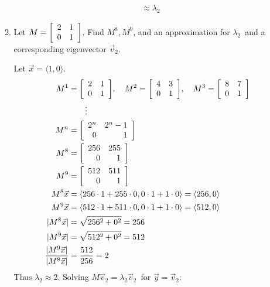 \documentclass{letter}
\newcommand{\norm}[1]{\lvert #1 \rvert}
\newcommand{\Ve}[1]{\langle #1 \rangle}
\newcommand{\Vn}[1]{\vec{#1}}
\newcommand{\?}{\stackrel{?}{=}}
\newcommand\Que[1]{%
   \leavevmode\noindent
   #1
}
\newcommand\Ans[2][]{%
   \leavevmode\noindent
   {
       \begin{mdframed}[backgroundcolor=blue!10]
       #2
       \end{mdframed}
   }
}
\newenvironment{Mat}[1]{%
  \left[\begin{array}{*{#1}{r}}
}{%
  \end{array}\right]
}
\begin{document}
\begin{enumerate}
\begin{enumerate}[label=(\alph*)]
{\begin{align*}
                                        &\approx \lambda_2
       \end{align*}        
    }
    \newpage
    \item \Que{
        Let $M=\begin{Mat}{2} 2 & 1 \\ 0 & 1 \end{Mat}$.  Find $M^8, M^9$, and an approximation for $\lambda_2$\ and a corresponding eigenvector $\Vn{v}_2$.
    }
    \Ans{
        Let $\Vn{x}=\Ve{1,0}$.
        \begin{align*}
          M^1 &= \begin{Mat}{2}  2 &     1 \\ 0 & 1 \end{Mat}, ~~~
          M^2 = \begin{Mat}{2}   4 &     3 \\ 0 & 1 \end{Mat}, ~~~
          M^3 = \begin{Mat}{2}   8 &     7 \\ 0 & 1 \end{Mat}\\
          & ~~~~~~\vdots \\
          M^n &= \begin{Mat}{2} 2^n & 2^n-1 \\ 0 & 1 \end{Mat} \\
          M^8 &= \begin{Mat}{2} 256 & 255 \\ 0 & 1 \end{Mat} \\
          M^9 &= \begin{Mat}{2} 512 & 511 \\ 0 & 1 \end{Mat} \\
          M^8\Vn{x} &= \Ve{256\cdot 1 + 255\cdot 0, 0\cdot 1 + 1\cdot 0}
                    = \Ve{256,0} \\
          M^9\Vn{x} &= \Ve{512\cdot 1+ 511\cdot 0, 0\cdot 1 + 1\cdot 0}
                    = \Ve{512,0}\\
          \norm{M^8\Vn{x}} &= \sqrt{256^2+0^2} = 256\\
          \norm{M^9\Vn{x}} &= \sqrt{512^2+0^2} = 512\\
          \frac{\norm{M^9\Vn{x}}}{\norm{M^8\Vn{x}}}&=\frac{512}{256}= 2 
        \end{align*}
        Thus $\lambda_2\approx 2$.  Solving $M\Vn{v}_2=\lambda_2\Vn{v}_2$\ for $\Vn{y}=\Vn{v}_2$:
}
\end{enumerate}
\end{enumerate}
\end{document}
